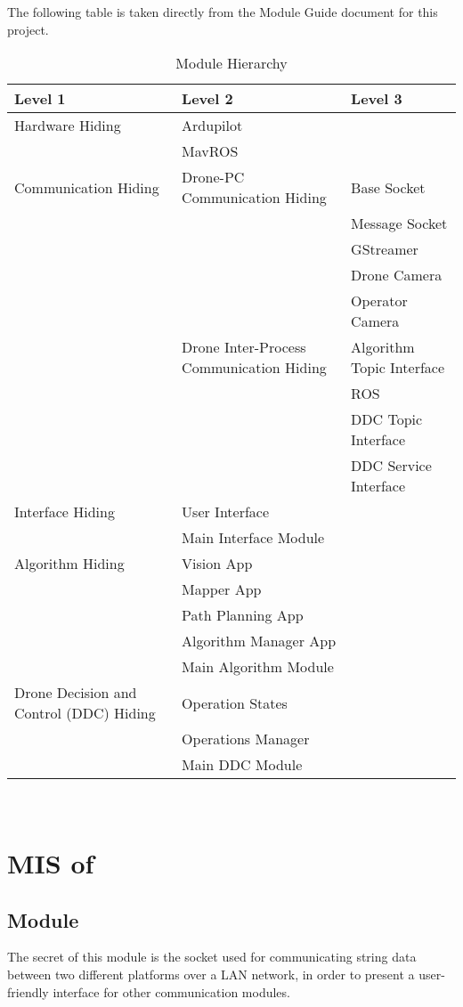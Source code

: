 \documentclass[12pt, titlepage]{article}
\begin{document}
The following table is taken directly from the Module Guide document for this project.

\begin{table}[h!]
\centering
\begin{tabular}{p{} p{}  p{}}
\toprule
\textbf{Level 1} & \textbf{Level 2} & 
\textbf{Level 3}\\
\midrule
{Hardware Hiding} & 
Ardupilot \\
& MavROS \\
\midrule
Communication Hiding &
Drone-PC Communication Hiding & Base Socket \\
 && Message Socket \\
 && GStreamer \\
 && Drone Camera \\
 && Operator Camera \\
 &{Drone Inter-Process Communication Hiding} 
& Algorithm Topic Interface \\
&& ROS \\
&& DDC Topic Interface \\
&& DDC Service Interface \\
\midrule
Interface Hiding
& User Interface \\
& Main Interface Module \\
\midrule
{Algorithm Hiding} 
& Vision App \\
& Mapper App \\
& Path Planning App \\
& Algorithm Manager App \\
& Main Algorithm Module \\
\midrule
{Drone Decision and Control (DDC) Hiding} 
& Operation States \\
& Operations Manager \\
& Main DDC Module \\
\midrule
\end{tabular}
\caption{Module Hierarchy}
\label{TblMH}
\end{table}

~\newpage

\section{MIS of } \label{MIS_MESSAGE_SOCKET} 
\subsection{Module}
The secret of this module is the socket used for communicating string data between two different platforms over a LAN network, in order to present a user-friendly interface for other communication modules.
\end{document}
